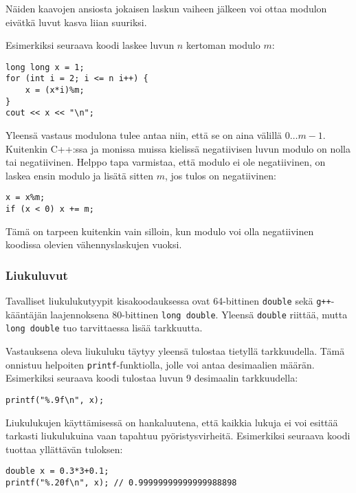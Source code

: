 Näiden kaavojen ansiosta
jokaisen laskun vaiheen jälkeen voi ottaa modulon
eivätkä luvut kasva liian suuriksi.

Esimerkiksi seuraava koodi
laskee luvun $n$ kertoman modulo $m$:

\begin{lstlisting}
long long x = 1;
for (int i = 2; i <= n i++) {
    x = (x*i)%m;
}
cout << x << "\n";
\end{lstlisting}

Yleensä vastaus modulona tulee antaa niin,
että se on aina välillä $0\ldots m-1$.
Kuitenkin C++:ssa ja monissa
muissa kielissä negatiivisen
luvun modulo on nolla tai negatiivinen.
Helppo tapa varmistaa, että modulo ei ole negatiivinen,
on laskea ensin modulo ja lisätä sitten $m$,
jos tulos on negatiivinen:

\begin{lstlisting}
x = x%m;
if (x < 0) x += m;
\end{lstlisting}
Tämä on tarpeen kuitenkin vain silloin,
kun modulo voi olla negatiivinen
koodissa olevien vähennyslaskujen vuoksi.

\subsubsection{Liukuluvut}


Tavalliset liukulukutyypit kisakoodauksessa
ovat 64-bittinen \texttt{double}
sekä \texttt{g++}-kääntäjän
laajennoksena
80-bittinen \texttt{long double}.
Yleensä \texttt{double} riittää,
mutta \texttt{long double} tuo tarvittaessa
lisää tarkkuutta.

Vastauksena oleva liukuluku täytyy yleensä tulostaa
tietyllä tarkkuudella.
Tämä onnistuu helpoiten \texttt{printf}-funktiolla,
jolle voi antaa desimaalien määrän.
Esimerkiksi seuraava koodi tulostaa luvun 9
desimaalin tarkkuudella:

\begin{lstlisting}
printf("%.9f\n", x);
\end{lstlisting}

Liukulukujen käyttämisessä on hankaluutena,
että kaikkia lukuja ei voi esittää tarkasti
liukulukuina vaan tapahtuu pyöristysvirheitä.
Esimerkiksi seuraava koodi tuottaa yllättävän tuloksen:

\begin{lstlisting}
double x = 0.3*3+0.1;
printf("%.20f\n", x); // 0.99999999999999988898
\end{lstlisting}

